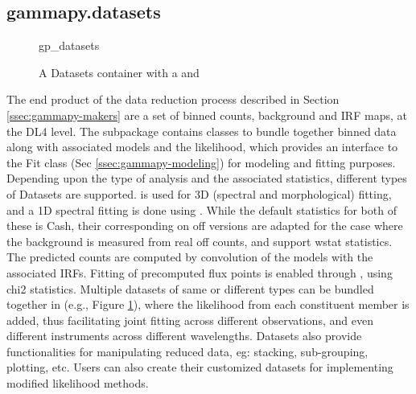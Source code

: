\subsection{gammapy.datasets}
\label{ssec:gammapy-datasets}

\begin{figure}
	{gp_datasets}
	\caption{A Datasets container with a  and }
	\label{fig*:minted:gp_datasets}
\end{figure}

The end product of the data reduction process described in Section
\ref{ssec:gammapy-makers} are a set of binned counts, background and IRF maps,
at the DL4 level. The  subpackage contains classes to bundle
together binned data along with associated models and the likelihood, which
provides an interface to the Fit class (Sec \ref{ssec:gammapy-modeling}) for
modeling and fitting purposes. Depending upon the type of analysis and the
associated statistics, different types of Datasets are supported.  is
used for 3D (spectral and morphological) fitting, and a 1D spectral fitting is
done using . While the default statistics for both of these is
Cash, their corresponding on off versions are adapted for the case where the
background is measured from real off counts, and support wstat statistics. The
predicted counts are computed by convolution of the models with the associated
IRFs. Fitting of precomputed flux points is enabled through ,
using chi2 statistics. Multiple datasets of same or different types can be
bundled together in  (e.g., Figure \ref{fig*:minted:gp_datasets}),
where the likelihood from each constituent member is added, thus facilitating
joint fitting across different observations, and even different instruments
across different wavelengths. Datasets also provide functionalities for
manipulating reduced data, eg: stacking, sub-grouping, plotting, etc. Users can
also create their customized datasets for implementing modified likelihood
methods.
